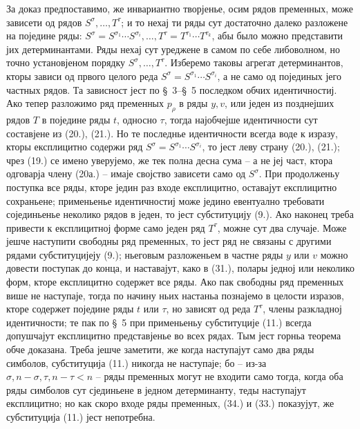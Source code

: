 \documentclass[11pt]{article}
\begin{document}
За доказ предпоставимо, же инвариантно творјенье, осим рядов пременных, може зависети од рядов $S^\sigma,\ldots,T^\tau$; и то нехај ти ряды сут достаточно далеко разложене на поједине ряды:
$S^\sigma=S^{\sigma_1}\cdots S^{\sigma_i},\ldots,T^\tau=T^{\tau_1}\cdots T^{\tau_k}$, абы было можно представити јих детерминантами. Ряды нехај сут уреджене в самом по себе либоволном, но точно установјеном порядку $S^\sigma,\ldots,T^\tau$. Изберемо таковы агрегат детерминантов, кторы зависи од првого целого реда $S^\sigma=S^{\sigma_1}\cdots S^{\sigma_i}$, а не само од појединых јего частных рядов. Та зависност јест по \S\ 3--\S\ 5 последком обчих идентичностиј. Ако тепер разложимо ряд пременных $p_\rho$ в ряды $y,v$, или једен из позднејших рядов $T$ в поједине ряды $t$, односно $\tau$, тогда најобчејше идентичности сут составјене из (20.), (21.). Но те последнье идентичности всегда воде к изразу, кторы експлицитно содержи ряд $S^\sigma=S^{\sigma_1}\cdots S^{\sigma_i}$, то јест леву страну (20.), (21.); чрез (19.) се имено уверујемо, же тек полна десна сума -- а не јеј част, ктора одговарја члену (20а.) -- имаје својство зависети само од $S^\sigma$. При продолженьу поступка все ряды, кторе једин раз входе експлицитно, оставајут експлицитно сохраньене; применьенье идентичностиј може једино евентуално требовати сојединьенье неколико рядов в једен, то јест субституцију (9.). Ако наконец треба привести к експлицитној форме само једен ряд $T^\tau$, можне сут два случаје. Може јешче наступити свободны ряд пременных, то јест ряд не связаны с другими рядами субституцијеју (9.); ньеговым разложеньем в частне ряды $y$ или $v$ можно довести поступак до конца, и наставајут, како в (31.), полары једној или неколико форм, кторе експлицитно содержет все ряды. Ако пак свободны ряд пременных више не наступаје, тогда по начину ньих настаньа познајемо в целости изразов, кторе содержет поједине ряды $t$ или $\tau$, но зависят од реда $T^\tau$, члены разкладној идентичности; те пак по \S\ 5 при применьеньу субституције (11.) всегда допушчајут експлицитно представјенье во всех рядах. Тым јест горньа теорема обче доказана. Треба јешче заметити, же когда наступајут само два ряды симболов, субституција (11.) никогда не наступаје; бо -- из-за $\sigma,n-\sigma,\tau,n-\tau<n$ -- ряды пременных могут не входити само тогда, когда оба ряды симболов сут сјединьене в једном детерминанту, теды наступајут експлицитно; но как скоро входе ряды пременных, (34.) и (33.) показујут, же субституција (11.) јест непотребна.
\end{document}
